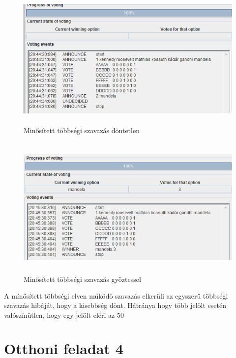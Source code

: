 \begin{figure}[!h]
\begin{center}
\includegraphics[height=7cm]{figures/ofel3_1.png}
\caption{Minősített többségi szavazás döntetlen}
\end{center}
\end{figure}
\begin{figure}[!h]
\begin{center}
\includegraphics[height=7cm]{figures/ofel3_2.png}
\caption{Minősített többségi szavazás győztessel}
\end{center}
\end{figure}
A mínősített többségi elven működő szavazás elkerüli az egyszerű többségi szavazás hibáját, hogy a kisebbség dönt. Hátránya hogy több jelölt esetén valószínütlen, hogy egy jelölt eléri az 50%

\section{Otthoni feladat 4}
